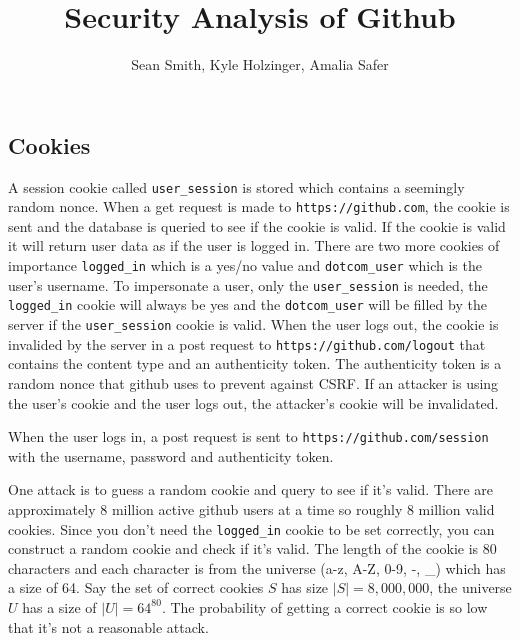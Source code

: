 \documentclass{lposter}
\author{Sean Smith, Kyle Holzinger, Amalia Safer}
\title{Security Analysis of Github}
\theoremstyle{plain}
\theoremstyle{definition}
\renewcommand{\tt}[1]{\texttt{#1}}
\begin{document}
\begin{poster}





\section{Cookies}

A session cookie called \tt{user\_session} is stored which contains a seemingly random nonce. When a get request is made to \tt{https://github.com}, the cookie is sent and the database is queried to see if the cookie is valid. If the cookie is valid it will return user data as if the user is logged in. There are two more cookies of importance \tt{logged\_in} which is a yes/no value and \tt{dotcom\_user} which is the user's username. To impersonate a user, only the \tt{user\_session} is needed, the \tt{logged\_in} cookie will always be yes and the \tt{dotcom\_user} will be filled by the server if the \tt{user\_session} cookie is valid. When the user logs out, the cookie is invalided by the server in a post request to \tt{https://github.com/logout} that contains the content type and an authenticity token. The authenticity token is a random nonce that github uses to prevent against CSRF. If an attacker is using the user's cookie and the user logs out, the attacker's cookie will be invalidated.


When the user logs in, a post request is sent to \tt{https://github.com/session} with the username, password and authenticity token.

One attack is to guess a random cookie and query to see if it's valid. There are approximately 8 million active github users at a time so roughly 8 million valid cookies. Since you don't need the \tt{logged\_in} cookie to be set correctly, you can construct a random cookie and check if it's valid. The length of the cookie is 80 characters and each character is from the universe (a-z, A-Z, 0-9, -, \_) which has a size of 64. Say the set of correct cookies $S$  has size $|S| = 8,000,000$, the universe $U$ has a size of $|U| = 64^{80}$. The probability of getting a correct cookie is so low that it's not a reasonable attack.


\end{poster}
\end{document}
